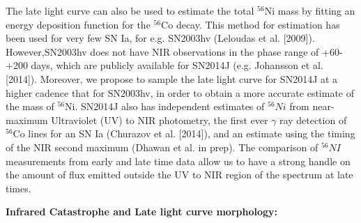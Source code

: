 \documentclass[11pt]{article}
\begin{document}
{The late light curve can also be used to estimate the total ${^56}$Ni mass by fitting an energy deposition function for the $^{56}$Co decay. This method for estimation has been used for very few SN Ia, for e.g. SN2003hv (Leloudas et al. [2009]). However,SN2003hv  does not have NIR observations in the phase range of +60-+200 days, which are publicly available for SN2014J (e.g. Johansson et al. [2014]). Moreover, we propose to sample the late light curve for SN2014J at a higher cadence that for SN2003hv, in order to obtain a  more accurate estimate of the mass of  $^{56}$Ni. SN2014J also has independent estimates of $^{56}Ni$ from near-maximum Ultraviolet (UV) to NIR photometry, the first ever  $\gamma$ ray detection of $^{56}$Co lines for an SN Ia (Churazov et al. [2014]), and an estimate using the timing of the NIR second maximum (Dhawan et al. in  prep).  The comparison of $^{56}NI$ measurements from early and late time data allow us to have a strong handle on the amount of flux emitted outside the UV to NIR region of the spectrum at late times. 

\textbf{Infrared Catastrophe and Late light curve morphology:}

}
\end{document}
